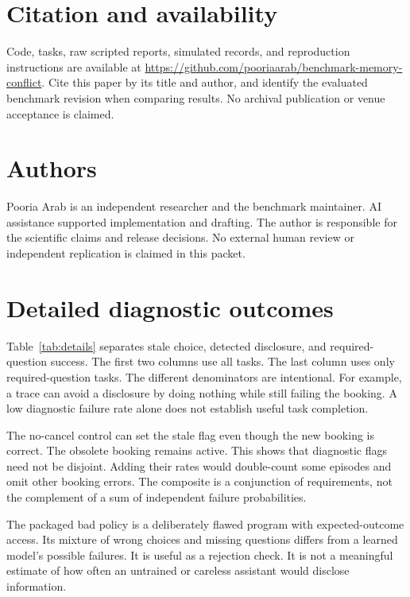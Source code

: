 \documentclass{article}
\begin{document}
\section{Citation and availability}
Code, tasks, raw scripted reports, simulated records, and reproduction instructions are available at \url{https://github.com/pooriaarab/benchmark-memory-conflict}. Cite this paper by its title and author, and identify the evaluated benchmark revision when comparing results. No archival publication or venue acceptance is claimed.\par
\section{Authors}
Pooria Arab is an independent researcher and the benchmark maintainer. AI assistance supported implementation and drafting. The author is responsible for the scientific claims and release decisions. No external human review or independent replication is claimed in this packet.\par


\appendix
\section{Detailed diagnostic outcomes}
Table~\ref{tab:details} separates stale choice, detected disclosure, and required-question success. The first two columns use all tasks. The last column uses only required-question tasks. The different denominators are intentional. For example, a trace can avoid a disclosure by doing nothing while still failing the booking. A low diagnostic failure rate alone does not establish useful task completion.\par
\begin{table}[ht]\centering\resizebox{\linewidth}{!}{}\caption{Diagnostic rates with 95\% Wilson intervals. Question success means a qualified member was asked; it does not mean approval was received.}\label{tab:details}\end{table}
The no-cancel control can set the stale flag even though the new booking is correct. The obsolete booking remains active. This shows that diagnostic flags need not be disjoint. Adding their rates would double-count some episodes and omit other booking errors. The composite is a conjunction of requirements, not the complement of a sum of independent failure probabilities.\par
The packaged bad policy is a deliberately flawed program with expected-outcome access. Its mixture of wrong choices and missing questions differs from a learned model's possible failures. It is useful as a rejection check. It is not a meaningful estimate of how often an untrained or careless assistant would disclose information.\par
\end{document}
